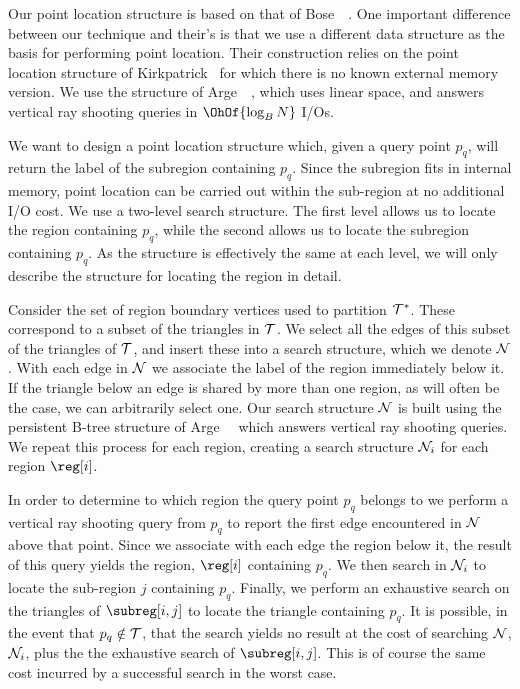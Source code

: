 {Our point location structure is based on that of 
Bose~\etal~\cite{DBLP:journals/talg/BoseCHMM12}.
One important difference between our technique and their's is that we use
a different data structure as the basis for performing point location.
Their construction relies on the point location structure of 
Kirkpatrick~\cite{DBLP:journals/siamcomp/Kirkpatrick83} for which there is no
known external memory version.  
We use the structure of Arge~\etal~\cite{DBLP:conf/alenex/ArgeDT03},
which uses linear space, and answers vertical ray shooting queries in 
$\OhOf{\log_B N}$ I/Os.

We want to design a point location structure which, given a query point $p_q$, 
will return the label of the subregion containing $p_q$. 
Since the subregion fits in internal memory, point location can be carried
out within the sub-region at no additional I/O cost.
We use a two-level search structure.  
The first level allows us to locate the region containing $p_q$, while the 
second allows us to locate the subregion containing $p_q$.
As the  structure is effectively the same at each level, we will only 
describe the structure for locating the region in detail.

Consider the set of region boundary vertices used to partition $\mathcal{T}^*$. 
These correspond to a subset of the triangles in $\mathcal{T}$.
We select all the edges of this subset of the triangles of $\mathcal{T}$,
and insert these into a search structure, which we denote $\mathcal{N}$.
With each edge in $\mathcal{N}$ we associate the label of the region
immediately below it.
If the triangle below an edge is shared by more than one region, as
will often be the case, we can arbitrarily select one. 
Our search structure $\mathcal{N}$ is built using the persistent B-tree structure of 
Arge~\etal~\cite{DBLP:conf/alenex/ArgeDT03} which answers vertical
ray shooting queries.
We repeat this process for each region, creating a search structure
$\mathcal{N}_i$ for each region $\reg[i]$.


In order to determine to which region the query point $p_q$ belongs to we perform a vertical 
ray shooting query from $p_q$ to report the first edge encountered in $\mathcal{N}$
above that point. 
Since we associate with each edge the region below it, the result of this query 
yields the region, $\reg[i]$ containing $p_q$.
We then search in $\mathcal{N}_i$ to locate the sub-region $j$ containing $p_q$.
Finally, we perform an exhaustive search on the triangles of $\subreg[i,j]$
to locate the triangle containing $p_q$.
It is possible, in the event that $p_q \notin \mathcal{T}$, that the search yields
no result at the cost of searching $\mathcal{N}$, $\mathcal{N}_i$, plus the
the exhaustive search of $\subreg[i,j]$.
This is of course the same cost incurred by a successful search in the worst
case.

}
